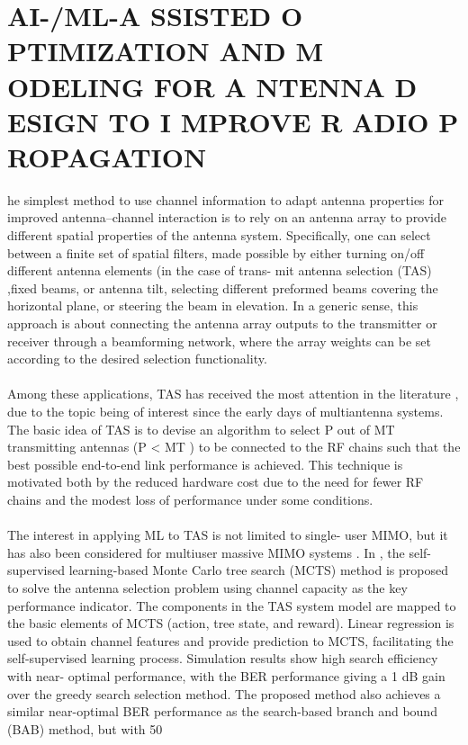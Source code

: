 \documentclass[conference]{IEEEtran}
\begin{document}
\section{AI-/ML-A SSISTED O PTIMIZATION AND M ODELING FOR A NTENNA D ESIGN TO I MPROVE R ADIO P ROPAGATION}
he simplest method to use channel information to adapt
antenna properties for improved antenna–channel interaction
is to rely on an antenna array to provide different spatial
properties of the antenna system. Specifically, one can select
between a finite set of spatial filters, made possible by either
turning on/off different antenna elements (in the case of trans-
mit antenna selection (TAS) ,fixed beams,
or antenna tilt, selecting different preformed beams covering
the horizontal plane, or steering the beam in elevation.
In a generic sense, this approach is about connecting the
antenna array outputs to the transmitter or receiver through
a beamforming network, where the array weights can be set
according to the desired selection functionality.

\paragraph{}
Among these applications, TAS has received the most
attention in the literature , due to the topic being
of interest since the early days of multiantenna systems.
The basic idea of TAS is to devise an algorithm to select P
out of MT transmitting antennas (P < MT ) to be connected
to the RF chains such that the best possible end-to-end link
performance is achieved. This technique is motivated both by
the reduced hardware cost due to the need for fewer RF chains
and the modest loss of performance under some conditions.


\paragraph{}
The interest in applying ML to TAS is not limited to single-
user MIMO, but it has also been considered for multiuser
massive MIMO systems . In , the self-supervised
learning-based Monte Carlo tree search (MCTS) method is
proposed to solve the antenna selection problem using channel
capacity as the key performance indicator. The components
in the TAS system model are mapped to the basic elements
of MCTS (action, tree state, and reward). Linear regression
is used to obtain channel features and provide prediction
to MCTS, facilitating the self-supervised learning process.
Simulation results show high search efficiency with near-
optimal performance, with the BER performance giving a 1 dB
gain over the greedy search selection method. The proposed
method also achieves a similar near-optimal BER performance
as the search-based branch and bound (BAB) method,
but with 50
\end{document}
